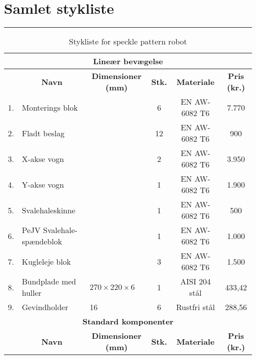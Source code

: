 \chapter{Samlet stykliste} \label{Bilag - stykliste}
\plainbreak{-3}


\setlength{\tabcolsep}{7pt}
\renewcommand{\arraystretch}{1.2}
\footnotesize
\begin{longtable}{|c p{4.5cm} p{3cm} c c c|} 
\caption{Stykliste for speckle pattern robot} \\

 \multicolumn{6}{|c|}{\cellcolor{aaublue} \color{white} \textbf{Lineær bevægelse}}  \\\hline
 \rowcolor{gray!10} \multicolumn{1}{|c}{\textbf{Nr.}} & \multicolumn{1}{c}{\textbf{Navn}} &  \multicolumn{1}{c}{\textbf{Dimensioner (mm)}} & \multicolumn{1}{c}{\textbf{Stk.}} & \multicolumn{1}{c}{\textbf{Materiale}} &  \multicolumn{1}{c|}{\textbf{Pris (kr.)}}  \\\hline

  1.& Monterings blok &  & 6 & EN AW-6082 T6 & 7.770 \\\hline
  2.& Fladt beslag &  & 12 & EN AW-6082 T6 & 900 \\\hline
  3.& X-akse vogn &  & 2 & EN AW-6082 T6 & 3.950 \\\hline
  4.& Y-akse vogn &  & 1 & EN AW-6082 T6 & 1.900 \\\hline
  5.& Svalehaleskinne &  & 1 & EN AW-6082 T6 & 500 \\\hline
  6.& PeJV Svalehale-spændeblok &  & 1 & EN AW-6082 T6 & 1.000 \\\hline
  7.& Kugleleje blok &  & 3 & EN AW-6082 T6 & 1.500 \\\hline
  8.& Bundplade med huller & $270 \times 220 \times 6$ & 1 & AISI 204 stål & 433,42 \\\hline
  9.& Gevindholder & 16  & 6 & Rustfri stål & 288,56 \\\hline


 \multicolumn{6}{|c|}{\cellcolor{aaublue} \color{white}\textbf{Standard komponenter}}  \\\hline
 \rowcolor{gray!10} \multicolumn{1}{|c}{\textbf{Nr.}} & \multicolumn{1}{c}{\textbf{Navn}} &  \multicolumn{1}{c}{\textbf{Dimensioner (mm)}} & \multicolumn{1}{c}{\textbf{Stk.}} & \multicolumn{1}{c}{\textbf{Materiale}} &  \multicolumn{1}{c|}{\textbf{Pris (kr.)}}  \\\hline


\end{longtable}
